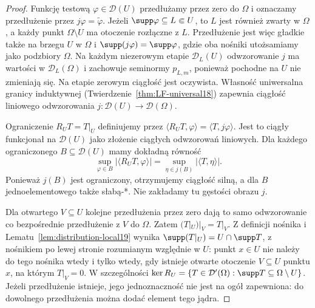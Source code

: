 \begin{proof}
Funkcję testową $\varphi\in\mathcal D(U)$ przedłużamy
przez zero do $\Omega$ i oznaczamy przedłużenie przez
$j\varphi=\widetilde\varphi$. Jeżeli
$\supp\varphi\subseteq L\Subset U$, to $L$ jest również
zwarty w $\Omega$, a każdy punkt $\Omega\setminus U$
ma otoczenie rozłączne z $L$. Przedłużenie jest więc
gładkie także na brzegu $U$ w $\Omega$ i
$\supp(j\varphi)=\supp\varphi$, gdzie oba nośniki
utożsamiamy jako podzbiory $\Omega$.
Na każdym niezerowym etapie $\mathcal D_L(U)$
odwzorowanie $j$ ma wartości w $\mathcal D_L(\Omega)$
i zachowuje seminormy $p_{L,m}$, ponieważ pochodne
na $U$ nie zmieniają się. Na etapie zerowym ciągłość
jest oczywista. Własność uniwersalna granicy induktywnej
(Twierdzenie~\ref{thm:LF-universal18}) zapewnia ciągłość
liniowego odwzorowania $j:\mathcal D(U)\to\mathcal D(\Omega)$.

Ograniczenie $R_U T=T|_U$ definiujemy przez
$\langle R_U T,\varphi\rangle=\langle T,j\varphi\rangle$.
Jest to ciągły funkcjonał na $\mathcal D(U)$ jako
złożenie ciągłych odwzorowań liniowych.
Dla każdego ograniczonego $B\subseteq\mathcal D(U)$
mamy dokładną równość
\[
 \sup_{\varphi\in B}|\langle R_U T,\varphi\rangle|
 =\sup_{\eta\in j(B)}|\langle T,\eta\rangle|.
\]
Ponieważ $j(B)$ jest ograniczony, otrzymujemy ciągłość
silną, a dla $B$ jednoelementowego także słabą-*.
Nie zakładamy tu gęstości obrazu $j$.

Dla otwartego $V\subseteq U$ kolejne przedłużenia przez
zero dają to samo odwzorowanie co bezpośrednie
przedłużenie z $V$ do $\Omega$. Zatem
$(T|_U)|_V=T|_V$. Z definicji nośnika i
Lematu~\ref{lem:distribution-local19} wynika
$\supp(T|_U)=U\cap\supp T$, z nośnikiem po lewej
stronie rozumianym względnie w $U$: punkt $x\in U$
nie należy do tego nośnika wtedy i tylko wtedy,
gdy istnieje otwarte otoczenie $V\subseteq U$ punktu
$x$, na którym $T|_V=0$. W szczególności
$\ker R_U=\{T\in\mathcal D'(\Omega):
\supp T\subseteq\Omega\setminus U\}$.
Jeżeli przedłużenie istnieje, jego jednoznaczność
nie jest na ogół zapewniona: do dowolnego przedłużenia
można dodać element tego jądra.


\end{proof}
